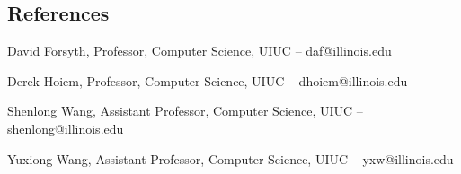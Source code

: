 \documentclass[margin,line]{res}
\newenvironment{list1}{
  \begin{list}{\ding{113}}{%
      \setlength{\itemsep}{0in}
      \setlength{\parsep}{0in} \setlength{\parskip}{0in}
      \setlength{\topsep}{0in} \setlength{\partopsep}{0in} 
      \setlength{\leftmargin}{0.17in}}}{\end{list}}
\begin{document}
\begin{resume}
\section{\sc \large References} 
\begin{list1}
\item[] David Forsyth, Professor, Computer Science, UIUC -- daf@illinois.edu
\item[] Derek Hoiem, Professor, Computer Science, UIUC  -- dhoiem@illinois.edu
\item[] Shenlong Wang, Assistant Professor, Computer Science, UIUC -- shenlong@illinois.edu
\item[] Yuxiong Wang, Assistant Professor, Computer Science, UIUC -- yxw@illinois.edu
\end{list1}


\end{resume}
\end{document}
